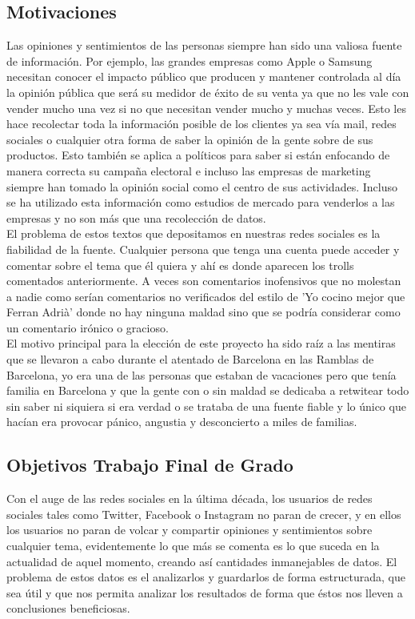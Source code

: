 \documentclass[../all.tex]{subfiles}
\begin{document}
\subsection{Motivaciones}
    Las opiniones y sentimientos de las personas siempre han sido una valiosa fuente de información. Por ejemplo, las grandes empresas como Apple o Samsung necesitan conocer el impacto público que producen y mantener controlada al día la opinión pública que será su medidor de éxito de su venta ya que no les vale con vender mucho una vez si no que necesitan vender mucho y muchas veces. Esto les hace recolectar toda la información posible de los clientes ya sea vía mail, redes sociales o cualquier otra forma de saber la opinión de la gente sobre de sus productos. Esto también se aplica a políticos para saber si están enfocando de manera correcta su campaña electoral e incluso las empresas de marketing siempre han tomado la opinión social como el centro de sus actividades. Incluso se ha utilizado esta información como estudios de mercado para venderlos a las empresas y no son más que una recolección de datos.\\
    
    El problema de estos textos que depositamos en nuestras redes sociales es la fiabilidad de la fuente. Cualquier persona que tenga una cuenta puede acceder y comentar sobre el tema que él quiera y ahí es donde aparecen los trolls comentados anteriormente. A veces son comentarios inofensivos que no molestan a nadie como serían comentarios no verificados del estilo de 'Yo cocino mejor que Ferran Adrià' donde no hay ninguna maldad sino que se podría considerar como un comentario irónico o gracioso.\\
    
    El motivo principal para la elección de este proyecto ha sido raíz a las mentiras que se llevaron a cabo durante el atentado de Barcelona en las Ramblas de Barcelona, yo era una de las personas que estaban de vacaciones pero que tenía familia en Barcelona y que la gente con o sin maldad se dedicaba a retwitear todo sin saber ni siquiera si era verdad o se trataba de una fuente fiable y lo único que hacían era provocar pánico, angustia y desconcierto a miles de familias. 
    

\newpage
\subsection{Objetivos Trabajo Final de Grado}
    Con el auge de las redes sociales en la última década, los usuarios de redes sociales tales como Twitter, Facebook o Instagram no paran de crecer, y en ellos los usuarios no paran de volcar y compartir opiniones y sentimientos sobre cualquier tema, evidentemente lo que más se comenta es lo que suceda en la actualidad de aquel momento, creando así cantidades inmanejables de datos. El problema de estos datos es el analizarlos y guardarlos de forma estructurada, que sea útil y que nos permita analizar los resultados de forma que éstos nos lleven a conclusiones beneficiosas.\\
   
\end{document}
